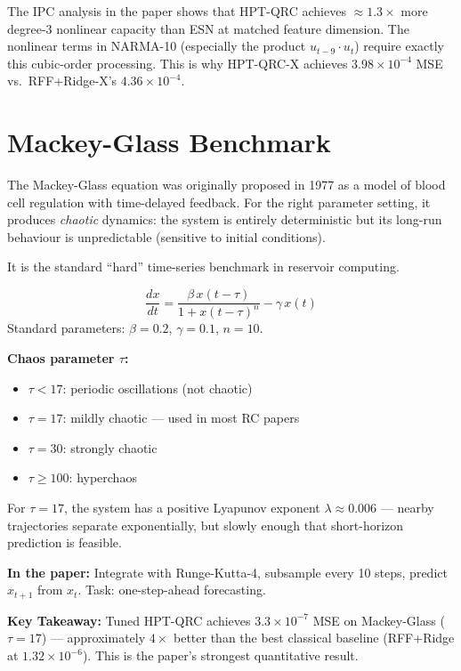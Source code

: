 \documentclass[11pt]{article}
\newcommand{\concept}[2]{%
  \begin{tcolorbox}[conceptbox, title={#1}]
  #2
  \end{tcolorbox}
}
\newcommand{\mathblock}[2]{%
  \begin{tcolorbox}[mathbox, title={Math: #1}]
  #2
  \end{tcolorbox}
}
\newcommand{\example}[2]{%
  \begin{tcolorbox}[examplebox, title={Concrete Example: #1}]
  #2
  \end{tcolorbox}
}
\newcommand{\keypoint}[1]{%
  \begin{tcolorbox}[keybox]
  \textbf{Key Takeaway:} #1
  \end{tcolorbox}
}
\begin{document}
\example{Why NARMA-10 Favours HPT-QRC}{
The IPC analysis in the paper shows that HPT-QRC achieves $\approx 1.3\times$
more degree-3 nonlinear capacity than ESN at matched feature dimension.
The nonlinear terms in NARMA-10 (especially the product $u_{t-9} \cdot u_t$)
require exactly this cubic-order processing. This is why HPT-QRC-X achieves
$3.98 \times 10^{-4}$ MSE vs.\ RFF+Ridge-X's $4.36 \times 10^{-4}$.
}

\section{Mackey-Glass Benchmark}

\concept{A Classic Chaotic System}{
The Mackey-Glass equation was originally proposed in 1977 as a model of
blood cell regulation with time-delayed feedback. For the right parameter
setting, it produces \emph{chaotic} dynamics: the system is entirely
deterministic but its long-run behaviour is unpredictable (sensitive to
initial conditions).

It is the standard ``hard'' time-series benchmark in reservoir computing.
}

\mathblock{Mackey-Glass Equation}{
\[
  \frac{dx}{dt} = \frac{\beta\, x(t - \tau)}{1 + x(t-\tau)^n} - \gamma\, x(t)
\]
Standard parameters: $\beta = 0.2$, $\gamma = 0.1$, $n = 10$.

\textbf{Chaos parameter $\tau$:}
\begin{itemize}
  \item $\tau < 17$: periodic oscillations (not chaotic)
  \item $\tau = 17$: mildly chaotic --- used in most RC papers
  \item $\tau = 30$: strongly chaotic
  \item $\tau \geq 100$: hyperchaos
\end{itemize}

For $\tau = 17$, the system has a positive Lyapunov exponent
$\lambda \approx 0.006$ --- nearby trajectories separate exponentially,
but slowly enough that short-horizon prediction is feasible.

\textbf{In the paper:} Integrate with Runge-Kutta-4, subsample every 10
steps, predict $x_{t+1}$ from $x_t$. Task: one-step-ahead forecasting.
}

\keypoint{Tuned HPT-QRC achieves $3.3 \times 10^{-7}$ MSE on Mackey-Glass
($\tau=17$) --- approximately $4\times$ better than the best classical
baseline (RFF+Ridge at $1.32 \times 10^{-6}$). This is the paper's
strongest quantitative result.}
\end{document}
